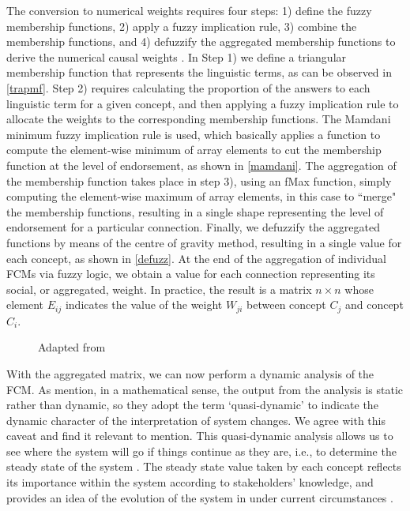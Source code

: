 The conversion to numerical weights requires four steps: 1) define the fuzzy membership functions, 2) apply a fuzzy implication rule, 3) combine the membership functions, and 4) defuzzify the aggregated membership functions to derive the numerical causal weights \citep{mkhitaryan2022fcmpy}. In Step 1) we define a triangular membership function that represents the linguistic terms, as can be observed in \cref{trapmf}. Step 2) requires calculating the proportion of the answers to each linguistic term for a given concept, and then applying a fuzzy implication rule to allocate the weights to the corresponding membership functions. The Mamdani minimum fuzzy implication rule is used, which basically applies a function to compute the element-wise minimum of array elements to cut the membership function at the level of endorsement, as shown in \cref{mamdani}. The aggregation of the membership function takes place in step 3), using an fMax function, simply computing the element-wise maximum of array elements, in this case to ``merge" the membership functions, resulting in a single shape representing the level of endorsement for a particular connection. Finally, we defuzzify the aggregated functions by means of the centre of gravity method, resulting in a single value for each concept, as shown in \cref{defuzz}. At the end of the aggregation of individual FCMs via fuzzy logic, we obtain a value for each connection representing its social, or aggregated, weight. In practice, the result is a matrix $n \times n$ whose element $ E_{ij} $ indicates the value of the weight $ W_{ji} $ between concept $ C_{j} $ and concept $ C_{i} $. 



\begin{figure}\centering
{}\hfill
{}\par 
{}
\caption*{Adapted from \cite{mkhitaryan2022fcmpy}}
\label{FCMpy}
\end{figure}



With the aggregated matrix, we can now perform a dynamic analysis of the FCM. As \cite{edwards2021building} mention, in a mathematical sense, the output from the analysis is static rather than dynamic, so they adopt the term ‘quasi-dynamic’ to indicate the dynamic character of the interpretation of system changes. We agree with this caveat and find it relevant to mention. This quasi-dynamic analysis allows us to see where the system will go if things continue as they are, i.e., to determine the steady state of the system \citep{ozesmi2004ecological}. The steady state value taken by each concept reflects its importance within the system according to stakeholders' knowledge, and provides an idea of the evolution of the system in under current circumstances \citep{lopolito2020combined}. 

